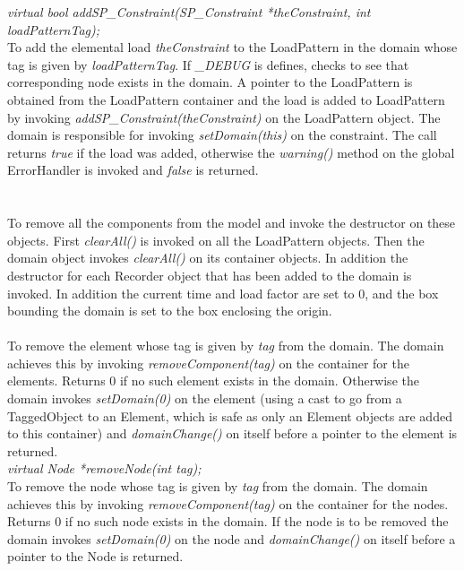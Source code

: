 {\em virtual bool addSP\_Constraint(SP\_Constraint *theConstraint, int
loadPatternTag);}  \\  
To add the elemental load {\em theConstraint} to the LoadPattern in the domain
whose tag is given by {\em loadPatternTag}.
If {\em \_DEBUG} is defines, checks to see that corresponding node
exists in the domain. A pointer to the LoadPattern is obtained from
the LoadPattern container and the load is added to LoadPattern by
invoking {\em addSP\_Constraint(theConstraint)} on the LoadPattern object. The
domain is responsible for invoking {\em setDomain(this)} on the
constraint. The call returns {\em true} if the load was added, otherwise the
{\em warning()} method on the global ErrorHandler is invoked and {\em
false} is returned.\\ 


  \\
\\
To remove all the components from the model and invoke the destructor
on these objects. First {\em clearAll()} is invoked on all the
LoadPattern objects. Then the domain object invokes {\em
clearAll()} on its container objects. In addition the destructor for
each Recorder object that has been added to the domain is invoked. In
addition the current time and load factor are set to $0$, and the box
bounding the domain is set to the box enclosing the origin. \\


\\
To remove the element whose tag is given by {\em tag} from the
domain. The domain achieves this by invoking {\em
removeComponent(tag)} on the container for the elements. 
Returns $0$ if no such element exists in the domain. Otherwise 
the domain invokes {\em setDomain(0)} on the element (using a cast to
go from a TaggedObject to an Element, which is safe as only an
Element objects are added to this container) and {\em
domainChange()} on itself before a pointer to the element is returned. \\

{\em virtual Node *removeNode(int tag);}\\    
To remove the node whose tag is given by {\em tag} from the domain. 
The domain achieves this by invoking {\em
removeComponent(tag)} on the container for the nodes. 
Returns $0$ if no such node exists in the domain. If the node is to be
removed the domain invokes {\em setDomain(0)} on the node and {\em
domainChange()} on itself before a pointer to the Node is returned.\\ 

